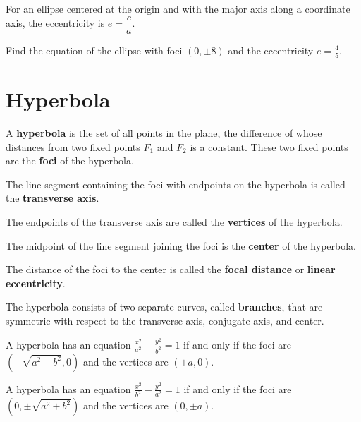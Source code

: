 For an ellipse centered at the origin and with the major axis along a coordinate axis, the eccentricity is $e=\dfrac ca$.

\begin{example}
    Find the equation of the ellipse with foci $(0, \pm8)$ and the eccentricity $e=\frac45$.
\end{example}
\vspace*{8\baselineskip}

\section{Hyperbola}

\begin{definition}
    A \textbf{hyperbola} is the set of all points in the plane, the difference of whose distances
    from two fixed points $F_1$ and $F_2$ is a constant. These two
    fixed points are the \textbf{foci} of the hyperbola.
\end{definition}

\begin{definition}
    The line segment containing the foci with endpoints on the hyperbola is called the \textbf{transverse axis}.

    The endpoints of the transverse axis are called the \textbf{vertices} of the hyperbola.

    The midpoint of the line segment joining the foci is the \textbf{center} of the hyperbola.

    The distance of the foci to the center is called the \textbf{focal distance} or \textbf{linear eccentricity}.

    The hyperbola consists of two separate curves, called \textbf{branches}, that are symmetric with respect to the transverse axis, conjugate
    axis, and center. \end{definition}


\begin{theorem}
A hyperbola has an equation $\frac{x^2}{a^2}-\frac{y^2}{b^2}=1$ if and only if the foci are $(\pm \sqrt{a^2+b^2}, 0)$ and the vertices are $(\pm a, 0)$.
\end{theorem}

\begin{theorem}
A hyperbola has an equation $\frac{x^2}{b^2}-\frac{y^2}{a^2}=1$ if and only if the foci are $(0, \pm \sqrt{a^2+b^2})$ and the vertices are $(0, \pm a)$.
\end{theorem}

